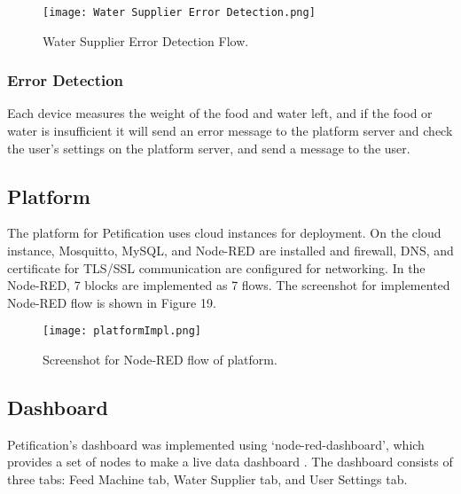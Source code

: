\documentclass[conference]{IEEEtran}
\begin{document}
\begin{figure}[htbp]
\centerline{\texttt{[image: Water Supplier Error Detection.png]}}
\caption{Water Supplier Error Detection Flow.}
\label{fig}
\end{figure}

\subsubsection{Error Detection}
Each device measures the weight of the food and water left, and if the food or water is
insufficient it will send an error message to the platform server and check the user’s settings on
the platform server, and send a message to the user.

\subsection{Platform}
The platform for Petification uses cloud instances for deployment. On the cloud instance, Mosquitto, MySQL, and Node-RED are installed and firewall, DNS, and certificate for TLS/SSL communication are configured for networking. In the Node-RED, 7 blocks are implemented as 7 flows. The screenshot for implemented Node-RED flow is shown in Figure 19.

\begin{figure}[htbp]
\centerline{\texttt{[image: platformImpl.png]}}
\caption{Screenshot for Node-RED flow of platform.}
\label{fig}
\end{figure}

\subsection{Dashboard}
Petification’s dashboard was implemented using ‘node-red-dashboard’, which provides a set of nodes to make a live data dashboard \cite{b19}.
The dashboard consists of three tabs: Feed Machine tab, Water Supplier tab, and User Settings tab. \\
\end{document}
